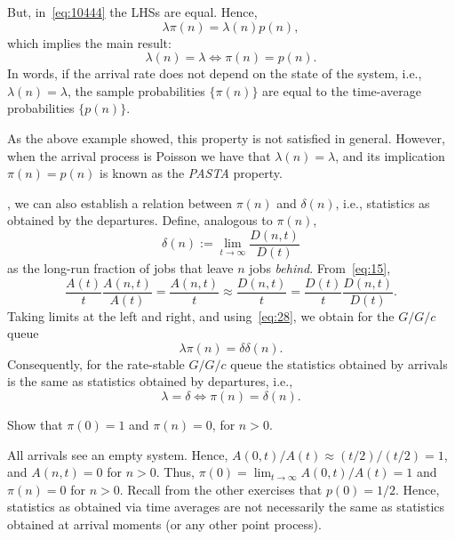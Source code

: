 But, in~\cref{eq:10444} the LHSs are equal. Hence,
\begin{equation}\label{eq:13}
\lambda \pi(n) = \lambda(n) p(n),
\end{equation}
which implies the main result:
\begin{equation*}
 \lambda(n) = \lambda \iff \pi(n) = p(n).
\end{equation*}
In words,  if the arrival rate does not depend on the state of the system, i.e., $\lambda(n)=\lambda$, the sample probabilities $\{\pi(n)\}$ are equal to the time-average probabilities $\{p(n)\}$.

As the above example showed, this property is not satisfied in general.
However, when the arrival process is Poisson we have that $\lambda(n)=\lambda$, and its implication $\pi(n)=p(n)$ is known as the \emph{PASTA} property.


, we can also establish a relation between $\pi(n)$ and $\delta(n)$, i.e.,  statistics as obtained by the departures.
Define, analogous to $\pi(n)$,
\begin{equation*}
 \delta(n) := \lim_{t\to\infty} \frac{D(n,t)}{D(t)}
\end{equation*}
as the long-run fraction of jobs that leave $n$ jobs \emph{behind}.
From~\cref{eq:15},
\begin{equation*}
\frac{A(t)}t \frac{A(n,t)}{A(t)} = \frac{A(n,t)}t \approx \frac{D(n,t)}t
= \frac{D(t)}t \frac{D(n,t)}{D(t)}.
\end{equation*}
Taking limits at the left and right, and using~\cref{eq:28}, we obtain for the $G/G/c$ queue
\begin{equation} \label{eq:36}
 \lambda \pi(n) = \delta \delta(n).
\end{equation}
Consequently, for the  rate-stable $G/G/c$ queue  the statistics obtained by arrivals is the same as statistics obtained by departures, i.e.,
\begin{equation} \label{eq:39}
\lambda = \delta \iff \pi(n) = \delta(n).
\end{equation}

\begin{exercise}\label{ex:8}
Show that $\pi(0)=1$ and $\pi(n)=0$, for $n>0$.
\begin{solution}
  All arrivals see an empty system.
  Hence, $A(0,t)/A(t) \approx (t/2)/(t/2) = 1$, and $A(n,t)=0$ for $n>0$.
  Thus, $\pi(0) = \lim_{t\to\infty} A(0,t)/A(t) = 1$ and $\pi(n)=0$ for $n>0$.
  Recall from the other exercises that $p(0)=1/2$.
  Hence, statistics as obtained via time averages are not necessarily the same as statistics obtained at arrival moments (or any other point process).
\end{solution}

\end{exercise}

